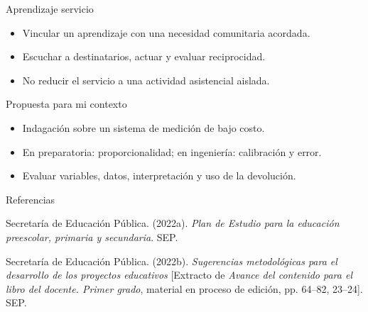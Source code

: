 \documentclass[
	spanish,
	aspectratio=1610,
	xcolor={dvipsnames,table}
]{beamer}
\begin{document}
\begin{frame}{Aprendizaje servicio}
\fontsize{14}{18}\selectfont\begin{itemize}\setlength{\itemsep}{.45cm}
\item Vincular un aprendizaje con una necesidad comunitaria acordada.
\item Escuchar a destinatarios, actuar y evaluar reciprocidad.
\item No reducir el servicio a una actividad asistencial aislada.
\end{itemize}
\end{frame}
\begin{frame}{Propuesta para mi contexto}
\fontsize{14}{18}\selectfont\begin{itemize}\setlength{\itemsep}{.45cm}
\item Indagación sobre un sistema de medición de bajo costo.
\item En preparatoria: proporcionalidad; en ingeniería: calibración y error.
\item Evaluar variables, datos, interpretación y uso de la devolución.
\end{itemize}
\end{frame}
\begin{frame}{Referencias}
\fontsize{9}{11}\selectfont\raggedright 
{\setlength{\parskip}{6pt}
\par\hangindent=1.27cm  Secretaría de Educación Pública. (2022a). \textit{Plan de Estudio para la educación preescolar, primaria y secundaria}. SEP.
\par\hangindent=1.27cm  Secretaría de Educación Pública. (2022b). \textit{Sugerencias metodológicas para el desarrollo de los proyectos educativos} [Extracto de \textit{Avance del contenido para el libro del docente. Primer grado}, material en proceso de edición, pp. 64--82, 23--24]. SEP.
}


\end{frame}
\end{document}
